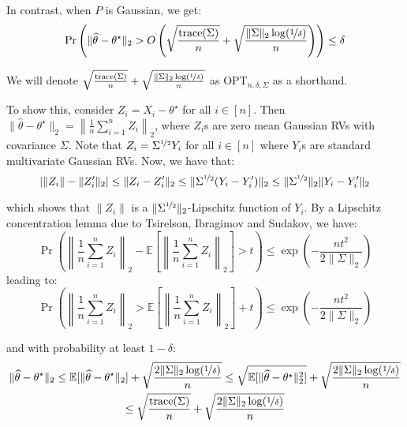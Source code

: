 \documentclass{article}
\theoremstyle{remark}
\theoremstyle{defintiion}
\newcommand{\Exp}{\mathbb{E}}
\newcommand{\trace}{\mathrm{trace}}
\newcommand{\OPT}{\mathrm{OPT}}
\newcommand{\eparam}{\widehat{\theta}}
\newcommand{\tparam}{\theta^{\star}}
\begin{document}
In contrast, when \(P\) is Gaussian, we get:
\begin{equation*}
\Pr\left(\|\eparam - \tparam\|_{2} > O\left(\sqrt{\frac{\trace(\Sigma)}{n}} + \sqrt{\frac{\|\Sigma\|_{2}\log(\nicefrac{1}{\delta})}{n}}\right)\right) \leq \delta
\end{equation*}

We will denote \(\sqrt{\frac{\trace(\Sigma)}{n}} + \sqrt{\frac{\|\Sigma\|_{2}\log(\nicefrac{1}{\delta})}{n}}\) as \(\OPT_{n, \delta, \Sigma}\) as a shorthand.

To show this, consider \(Z_{i} = X_{i} - \tparam\) for all \(i \in [n]\). Then \(\|\eparam - \tparam\|_{2} = \left\|\frac{1}{n}\sum\limits_{i=1}^{n}Z_{i}\right\|_{2}\), where \(Z_{i}\)s are zero mean Gaussian RVs with covariance \(\Sigma\). Note that \(Z_{i} = \Sigma^{\nicefrac{1}{2}}Y_{i}\) for all \(i \in [n]\) where \(Y_{i}\)s are standard multivariate Gaussian RVs. Now, we have that:
\begin{equation*}
|\|Z_{i}\| - \|Z'_{i}\|_{2}| \leq \|Z_{i} - Z'_{i}\|_{2} \leq \|\Sigma^{\nicefrac{1}{2}}(Y_{i} - Y'_{i})\|_{2} \leq \|\Sigma^{\nicefrac{1}{2}}\|_{2}\|Y_{i} - Y'_{i}\|_{2}
\end{equation*}

which shows that \(\|Z_{i}\|\) is a \(\|\Sigma^{\nicefrac{1}{2}}\|_{2}\)-Lipschitz function of \(Y_{i}\). By a Lipschitz concentration lemma due to Tsirelson, Ibragimov and Sudakov, we have:
\begin{equation*}
\Pr\left(\left\|\frac{1}{n} \sum_{i=1}^{n} Z_{i}\right\|_{2} - \Exp\left[\left\|\frac{1}{n} \sum_{i=1}^{n} Z_{i}\right\|_{2}\right] > t\right) \leq \exp\left(-\frac{nt^{2}}{2\|\Sigma\|_{2}}\right)
\end{equation*}
leading to:
\begin{equation*}
\Pr\left(\left\|\frac{1}{n} \sum_{i=1}^{n} Z_{i}\right\|_{2} > \Exp\left[\left\|\frac{1}{n} \sum_{i=1}^{n} Z_{i}\right\|_{2}\right] + t\right) \leq \exp\left(-\frac{nt^{2}}{2\|\Sigma\|_{2}}\right)
\end{equation*}

and with probability at least \(1 - \delta\):
\begin{multline*}
\|\eparam - \tparam\|_{2} \leq \Exp[\|\eparam - \tparam\|_{2}] + \sqrt{\frac{2\|\Sigma\|_{2}\log(\nicefrac{1}{\delta})}{n}} \leq \sqrt{\Exp[\|\eparam - \tparam\|_{2}^{2}]} + \sqrt{\frac{2\|\Sigma\|_{2}\log(\nicefrac{1}{\delta})}{n}} \\\leq \sqrt{\frac{\trace(\Sigma)}{n}} + \sqrt{\frac{2\|\Sigma\|_{2}\log(\nicefrac{1}{\delta})}{n}}
\end{multline*}
\end{document}
